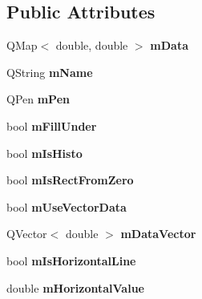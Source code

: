 \subsection*{Public Attributes}
\begin{DoxyCompactItemize}
\item 
\hypertarget{class_graph_curve_af326a0b304c8d5cb27d728049e3a9db1}{Q\-Map$<$ double, double $>$ {\bfseries m\-Data}}\label{class_graph_curve_af326a0b304c8d5cb27d728049e3a9db1}

\item 
\hypertarget{class_graph_curve_adc22ed9df4c02600d0705e506581f7cd}{Q\-String {\bfseries m\-Name}}\label{class_graph_curve_adc22ed9df4c02600d0705e506581f7cd}

\item 
\hypertarget{class_graph_curve_ad5f230f953ffc816cf269347ddacfc2c}{Q\-Pen {\bfseries m\-Pen}}\label{class_graph_curve_ad5f230f953ffc816cf269347ddacfc2c}

\item 
\hypertarget{class_graph_curve_ad6892fce5d7dc6e260a99e2b0dcef3b7}{bool {\bfseries m\-Fill\-Under}}\label{class_graph_curve_ad6892fce5d7dc6e260a99e2b0dcef3b7}

\item 
\hypertarget{class_graph_curve_a9263a1926a70e010d24873da6eab6b28}{bool {\bfseries m\-Is\-Histo}}\label{class_graph_curve_a9263a1926a70e010d24873da6eab6b28}

\item 
\hypertarget{class_graph_curve_afe0d05de613172f0f5cebb2f55cf2cd4}{bool {\bfseries m\-Is\-Rect\-From\-Zero}}\label{class_graph_curve_afe0d05de613172f0f5cebb2f55cf2cd4}

\item 
\hypertarget{class_graph_curve_a47376655f59335f5b8bd87ded7351055}{bool {\bfseries m\-Use\-Vector\-Data}}\label{class_graph_curve_a47376655f59335f5b8bd87ded7351055}

\item 
\hypertarget{class_graph_curve_a83fe52eeb4064ded5861f2de16ce00ef}{Q\-Vector$<$ double $>$ {\bfseries m\-Data\-Vector}}\label{class_graph_curve_a83fe52eeb4064ded5861f2de16ce00ef}

\item 
\hypertarget{class_graph_curve_a90c90776e45e38f959097e98bd79ccac}{bool {\bfseries m\-Is\-Horizontal\-Line}}\label{class_graph_curve_a90c90776e45e38f959097e98bd79ccac}

\item 
\hypertarget{class_graph_curve_aaf57f57d3b39bb7c3b6171207f02da30}{double {\bfseries m\-Horizontal\-Value}}\label{class_graph_curve_aaf57f57d3b39bb7c3b6171207f02da30}


\end{DoxyCompactItemize}
